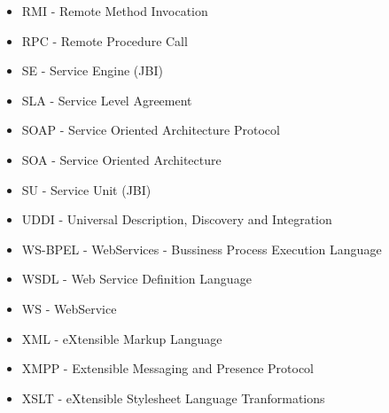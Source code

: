 \begin{itemize}
\item RMI - Remote Method Invocation
\item RPC - Remote Procedure Call
\item SE - Service Engine (JBI)
\item SLA - Service Level Agreement
\item SOAP - Service Oriented Architecture Protocol
\item SOA - Service Oriented Architecture
\item SU - Service Unit (JBI)
\item UDDI - Universal Description, Discovery and Integration
\item WS-BPEL - WebServices - Bussiness Process Execution Language
\item WSDL - Web Service Definition Language
\item WS - WebService
\item XML - eXtensible Markup Language
\item XMPP - Extensible Messaging and Presence Protocol
\item XSLT - eXtensible Stylesheet Language Tranformations
\end{itemize}

